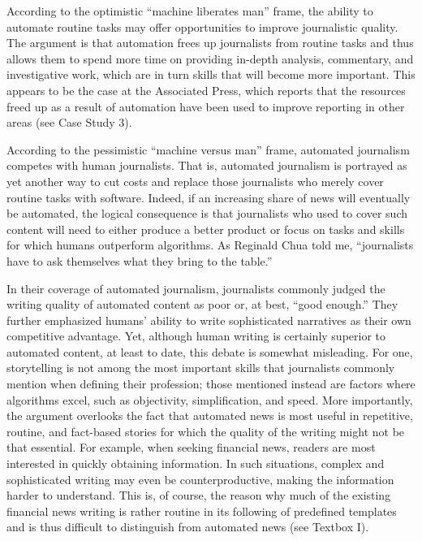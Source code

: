\documentclass[notoc, symmetric, nobib, nols]{towcenter-guideto-book}
\begin{document}
According to the optimistic ``machine liberates man'' frame, the ability to automate routine tasks may offer opportunities to improve journalistic quality. The argument is that automation frees up journalists from routine tasks and thus allows them to spend more time on providing in-depth analysis, commentary, and investigative work, which are in turn skills that will become more important. This appears to be the case at the Associated Press, which reports that the resources freed up as a result of automation have been used to improve reporting in other areas (see Case Study 3). 

According to the pessimistic ``machine versus man'' frame, automated journalism competes with human journalists. That is, automated journalism is portrayed as yet another way to cut costs and replace those journalists who merely cover routine tasks with software. Indeed, if an increasing share of news will eventually be automated, the logical consequence is that journalists who used to cover such content will need to either produce a better product or focus on tasks and skills for which humans outperform algorithms. As Reginald Chua told me, “journalists have to ask themselves what they bring to the table.”

In their coverage of automated journalism, journalists commonly judged the writing quality of automated content as poor or, at best, ``good enough.''  They further emphasized humans' ability to write sophisticated narratives as their own competitive advantage. Yet, although human writing is certainly superior to automated content, at least to date, this debate is somewhat misleading. For one, storytelling is not among the most important skills that journalists commonly mention when defining their profession; those mentioned instead are factors where algorithms excel, such as objectivity, simplification, and speed.\autocite{wei12} More importantly, the argument overlooks the fact that automated news is most useful in repetitive, routine, and fact-based stories for which the quality of the writing might not be that essential. For example, when seeking financial news, readers are most interested in quickly obtaining information. In such situations, complex and sophisticated writing may even be counterproductive, making the information harder to understand. This is, of course, the reason why much of the existing financial news writing is rather routine in its following of predefined templates and is thus difficult to distinguish from automated news (see Textbox I). 
\end{document}
